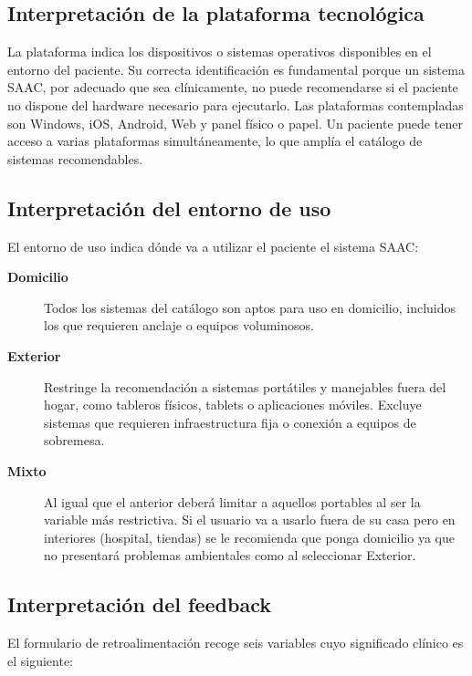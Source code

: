 \subsection{Interpretación de la plataforma tecnológica}
La plataforma indica los dispositivos o sistemas operativos disponibles en el entorno del paciente. Su correcta identificación es fundamental porque un sistema SAAC, por adecuado que sea clínicamente, no puede recomendarse si el paciente no dispone del hardware necesario para ejecutarlo. Las plataformas contempladas son Windows, iOS, Android, Web y panel físico o papel. Un paciente puede tener acceso a varias plataformas simultáneamente, lo que amplía el catálogo de sistemas recomendables.

\subsection{Interpretación del entorno de uso}
El entorno de uso indica dónde va a utilizar el paciente el sistema SAAC:

\begin{description}
	\item[\textbf{Domicilio}] Todos los sistemas del catálogo son aptos para uso en domicilio, incluidos los que requieren anclaje o equipos voluminosos.
	\item[\textbf{Exterior}] Restringe la recomendación a sistemas portátiles y manejables fuera del hogar, como tableros físicos, tablets o aplicaciones móviles. Excluye sistemas que requieren infraestructura fija o conexión a equipos de sobremesa.
	\item[\textbf{Mixto}] Al igual que el anterior deberá limitar a aquellos portables al ser la variable más restrictiva. Si el usuario va a usarlo fuera de su casa pero en interiores (hospital, tiendas) se le recomienda que ponga domicilio ya que no presentará problemas ambientales como 		al seleccionar Exterior.
\end{description}

\subsection{Interpretación del feedback}
El formulario de retroalimentación recoge seis variables cuyo significado clínico es el siguiente:

